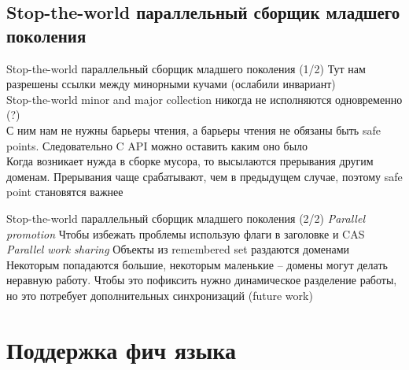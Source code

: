 \documentclass[aspectratio=169
  , xcolor={svgnames} 
  , hyperref={ colorlinks,citecolor=DeepPink4
             , linkcolor=DarkRed,urlcolor=DarkBlue}
  , russian
  ]{beamer}
\theoremstyle{exerciseStyle1}
\begin{document}
%



\subsection{Stop-the-world параллельный сборщик младшего поколения}

\begin{frame}{Stop-the-world параллельный сборщик младшего поколения (1/2)}
Тут нам разрешены ссылки между минорными кучами (ослабили инвариант)\\

Stop-the-world minor and major collection никогда не исполняются одновременно (?)\\

С ним нам не нужны барьеры чтения, а барьеры чтения не обязаны быть safe points. Следовательно C API можно оставить каким оно было\\

Когда возникает нужда в сборке мусора, то высылаются прерывания другим доменам. Прерывания чаще срабатывают, чем в предыдущем случае, поэтому 
safe point становятся важнее

\end{frame}

\begin{frame}{Stop-the-world параллельный сборщик младшего поколения (2/2)}
\textit{Parallel promotion} Чтобы избежать проблемы использую флаги в заголовке и CAS\\

\textit{Parallel work sharing} Объекты из remembered set раздаются доменами
Некоторым попадаются большие, некоторым маленькие -- домены могут делать неравную работу. Чтобы это пофиксить нужно динамическое разделение работы, но это потребует дополнительных синхронизаций (future work)

\end{frame}

\section{Поддержка фич языка}
\end{document}
